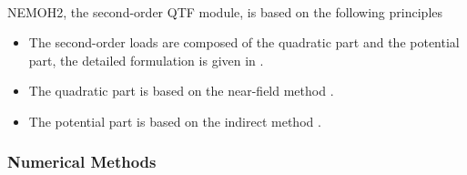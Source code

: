 \documentclass[12pt,a4paper,titlepage]{article}
\begin{document}
\ \\
NEMOH2, the second-order QTF module, is based on the following principles
\begin{itemize}
\item The second-order loads are composed of the quadratic part and the potential part, the detailed formulation is given in \cite{Kurnia22_JH,Kurnia22}.
\item The quadratic part is based on the near-field method \cite{CHEN88}. 
\item The potential part is based on the 
indirect method \cite{CHEN88,MOLIN79}.
\end{itemize}

\subsubsection*{Numerical Methods}
\end{document}
